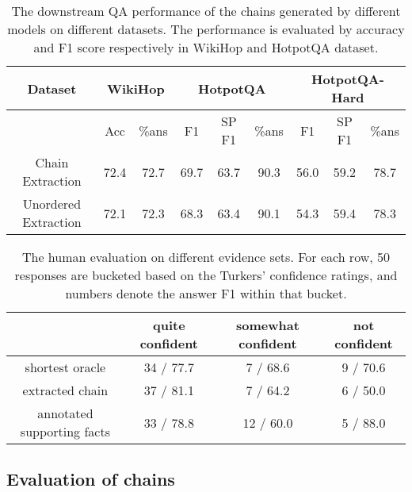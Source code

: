 \documentclass[11pt,a4paper]{article}
\begin{document}
\begin{table*}[t]
\small
\centering
\renewcommand{\tabcolsep}{1.3mm}
\begin{tabular}{ c | c   c   |  c  c c | c c c }
\toprule
 Dataset & \multicolumn{2}{c|}{WikiHop} & \multicolumn{3}{c|}{HotpotQA} & \multicolumn{3}{c}{HotpotQA-Hard} \\ 
\midrule
 & Acc &  \%ans  & F1 & SP F1 & \%ans &  F1 & SP F1 &  \%ans  \\ \midrule
Chain Extraction & 72.4 & 72.7 & 69.7 & 63.7 & 90.3 & 56.0 & 59.2 & 78.7 \\
Unordered Extraction & 72.1 & 72.3 & 68.3 & 63.4 & 90.1 & 54.3 & 59.4 & 78.3 \\
\bottomrule
\end{tabular}
\caption{The downstream QA performance of the chains generated by different models on different datasets. The performance is evaluated by accuracy and F1 score respectively in WikiHop and HotpotQA dataset.}
\label{tab:performance_oracle_model}
\end{table*}

\begin{table*}[t]
\small
\centering
\renewcommand{\tabcolsep}{1.3mm}
\begin{tabular}{ c  c   c   c   }
\toprule
            & quite confident  & somewhat confident & not confident    \\
\midrule
shortest oracle  &  34 / 77.7 & 7 / 68.6  & 9 / 70.6  \\
extracted chain  & 37 / 81.1 & 7 / 64.2 & 6 / 50.0 \\
annotated supporting facts  & 33 / 78.8 & 12 / 60.0  & 5 / 88.0 \\
\bottomrule
\end{tabular}
\caption{The human evaluation on different evidence sets. For each row, 50 responses are bucketed based on the Turkers' confidence ratings, and numbers denote the answer F1 within that bucket.}
\vspace{-0.5cm}
\label{tab:human_eval}
\end{table*}








\subsection{Evaluation of chains}
\end{document}

